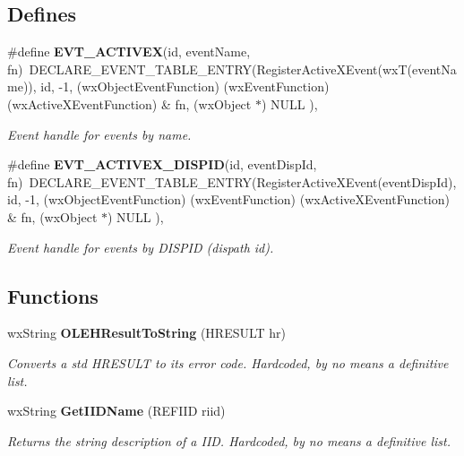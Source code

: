 \subsection*{Defines}
\begin{CompactItemize}
\item 
{}
\#define {\bf EVT\_\-ACTIVEX}(id, event\-Name, fn)\ DECLARE\_\-EVENT\_\-TABLE\_\-ENTRY(Register\-Active\-XEvent(wx\-T(event\-Name)), id, -1, (wx\-Object\-Event\-Function) (wx\-Event\-Function) (wx\-Active\-XEvent\-Function) \& fn, (wx\-Object $\ast$) NULL ),\label{wxactivex_8h_a10}

\begin{CompactList}\small\item\em Event handle for events by name.\item\end{CompactList}\item 
{}
\#define {\bf EVT\_\-ACTIVEX\_\-DISPID}(id, event\-Disp\-Id, fn)\ DECLARE\_\-EVENT\_\-TABLE\_\-ENTRY(Register\-Active\-XEvent(event\-Disp\-Id), id, -1, (wx\-Object\-Event\-Function) (wx\-Event\-Function) (wx\-Active\-XEvent\-Function) \& fn, (wx\-Object $\ast$) NULL ),\label{wxactivex_8h_a11}

\begin{CompactList}\small\item\em Event handle for events by DISPID (dispath id).\item\end{CompactList}\end{CompactItemize}
\subsection*{Functions}
\begin{CompactItemize}
\item 
{}
wx\-String {\bf OLEHResult\-To\-String} (HRESULT hr)\label{wxactivex_8h_a13}

\begin{CompactList}\small\item\em Converts a std HRESULT to its error code. Hardcoded, by no means a definitive list.\item\end{CompactList}\item 
{}
wx\-String {\bf Get\-IIDName} (REFIID riid)\label{wxactivex_8h_a14}

\begin{CompactList}\small\item\em Returns the string description of a IID. Hardcoded, by no means a definitive list.\item\end{CompactList}\end{CompactItemize}


